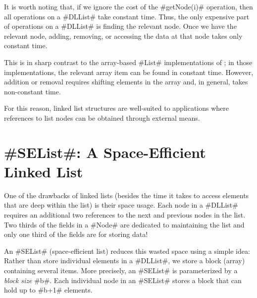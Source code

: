 It is worth noting that, if we ignore the cost of the #getNode(i)#
operation, then all operations on a #DLList# take constant time.
Thus, the only expensive part of operations on a #DLList# is finding
the relevant node.  Once we have the relevant node, adding, removing,
or accessing the data at that node takes only constant time.

This is in sharp contrast to the array-based #List# implementations of
; in those implementations, the relevant array
item can be found in constant time. However, addition or removal requires
shifting elements in the array and, in general, takes non-constant time.

For this reason, linked list structures are well-suited to applications
where references to list nodes can be obtained through external means.

\section{#SEList#: A Space-Efficient Linked List}

One of the drawbacks of linked lists (besides the time it takes to
access elements that are deep within the list) is their space usage.
Each node in a #DLList# requires an additional two references to the next
and previous nodes in the list.  Two thirds of the fields in a #Node#
are dedicated to maintaining the list and only one third of the fields
are for storing data!

An #SEList# (space-efficient list) reduces this wasted space using
a simple idea: Rather than store individual elements in a #DLList#,
we store a block (array) containing several items. More precisely, an
#SEList# is parameterized by a \emph{block size} #b#. Each individual
node in an #SEList# stores a block that can hold up to #b+1# elements.

